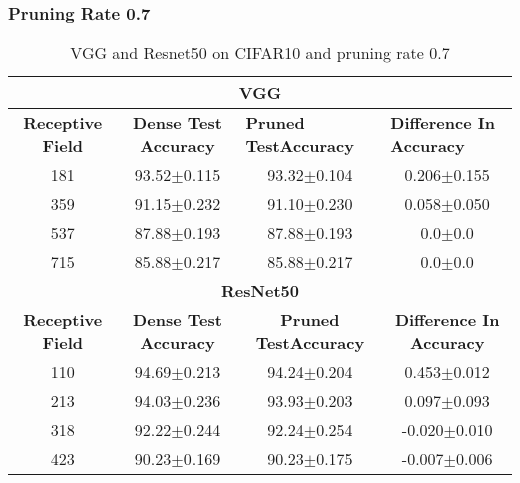 \subsubsection*{Pruning Rate 0.7}
\begin{table}[H]
\begin{tabular}{@{}cccc@{}}
\toprule
\multicolumn{4}{c}{\textbf{VGG}}                                                                                                                                  \\ \midrule
\textbf{Receptive Field} & \textbf{Dense Test Accuracy} & \multicolumn{1}{l}{\textbf{Pruned  TestAccuracy}} & \multicolumn{1}{l}{\textbf{Difference In Accuracy}} \\ \midrule
181                      & 93.52$\pm$0.115              & 93.32$\pm$0.104                                   & 0.206$\pm$0.155                                     \\
359                      & 91.15$\pm$0.232              & 91.10$\pm$0.230                                   & 0.058$\pm$0.050                                     \\
537                      & 87.88$\pm$0.193              & 87.88$\pm$0.193                                   & 0.0$\pm$0.0                                         \\
715                      & 85.88$\pm$0.217              & 85.88$\pm$0.217                                   & 0.0$\pm$0.0                                         \\ \midrule
\multicolumn{4}{c}{\textbf{ResNet50}}                                                                                                                             \\ \midrule
\textbf{Receptive Field} & \textbf{Dense Test Accuracy} & \textbf{Pruned  TestAccuracy}                     & \textbf{Difference In Accuracy}                     \\
110                      & 94.69$\pm$0.213              & 94.24$\pm$0.204                                   & 0.453$\pm$0.012                                     \\
213                      & 94.03$\pm$0.236              & 93.93$\pm$0.203                                   & 0.097$\pm$0.093                                     \\
318                      & 92.22$\pm$0.244              & 92.24$\pm$0.254                                   & -0.020$\pm$0.010                                    \\
423                      & 90.23$\pm$0.169              & 90.23$\pm$0.175                                   & -0.007$\pm$0.006                                    \\ \bottomrule
\end{tabular}
\caption{VGG and Resnet50 on CIFAR10 and pruning rate 0.7}
\label{tab:cifar10 pruning rate07}
\end{table}

